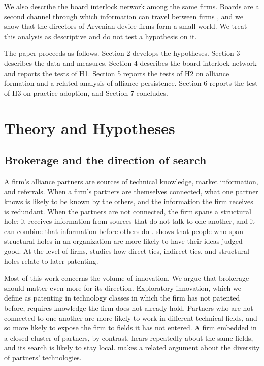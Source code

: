 \documentclass[12pt]{article}
\begin{document}
We also describe the board interlock network among the same firms. Boards are a second channel through which information can travel between firms \citep{mizruchi1996}, and we show that the directors of Arvenian device firms form a small world. We treat this analysis as descriptive and do not test a hypothesis on it.

The paper proceeds as follows. Section 2 develops the hypotheses. Section 3 describes the data and measures. Section 4 describes the board interlock network and reports the tests of H1. Section 5 reports the tests of H2 on alliance formation and a related analysis of alliance persistence. Section 6 reports the test of H3 on practice adoption, and Section 7 concludes.

\section{Theory and Hypotheses}

\subsection{Brokerage and the direction of search}

A firm's alliance partners are sources of technical knowledge, market information, and referrals. When a firm's partners are themselves connected, what one partner knows is likely to be known by the others, and the information the firm receives is redundant. When the partners are not connected, the firm spans a structural hole: it receives information from sources that do not talk to one another, and it can combine that information before others do \citep{burt1992}. \citet{burt2004} shows that people who span structural holes in an organization are more likely to have their ideas judged good. At the level of firms, \citet{ahuja2000} studies how direct ties, indirect ties, and structural holes relate to later patenting.

Most of this work concerns the volume of innovation. We argue that brokerage should matter even more for its direction. Exploratory innovation, which we define as patenting in technology classes in which the firm has not patented before, requires knowledge the firm does not already hold. Partners who are not connected to one another are more likely to work in different technical fields, and so more likely to expose the firm to fields it has not entered. A firm embedded in a closed cluster of partners, by contrast, hears repeatedly about the same fields, and its search is likely to stay local. \citet{phelps2010} makes a related argument about the diversity of partners' technologies.
\end{document}
